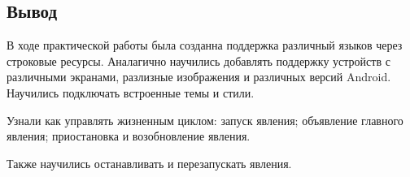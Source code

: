 \newpage

\subsection*{Вывод}
В ходе практической работы была созданна поддержка различный языков через
строковые ресурсы. Аналагично научились добавлять поддержку устройств с
различными экранами, разлизные изображения и различных версий Android.
Научились подключать встроенные темы и стили.\par
Узнали как управлять жизненным циклом: запуск явления; объявление
главного явления; приостановка и возобновление явления.\par
Также научились останавливать и перезапускать явления.

